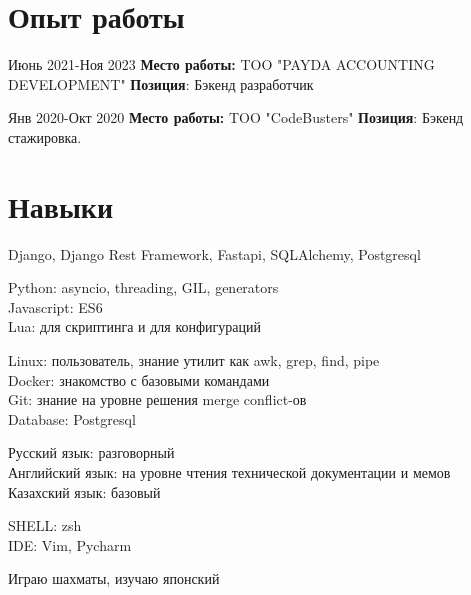 \documentclass[10pt]{article} %
\begin{document}
\section{Опыт работы}

\job
{Июнь 2021-}{Ноя 2023}
{\textbf{Место работы: }TOO "PAYDA ACCOUNTING DEVELOPMENT"}
{\textbf{Позиция}: Бэкенд разработчик}

\job
{Янв 2020-}{Окт 2020}
{\textbf{Место работы: }TOO "CodeBusters" }
{\textbf{Позиция}: Бэкенд стажировка. }




\section{Навыки}

{
  Django, Django Rest Framework, Fastapi, SQLAlchemy, Postgresql
}

{
  Python: asyncio, threading, GIL, generators\\
  Javascript: ES6\\
  Lua: для скриптинга и для конфигураций
}

{
  Linux: пользователь, знание утилит как awk, grep, find, pipe\\
  Docker: знакомство с базовыми командами\\
  Git: знание на уровне решения merge conflict-ов\\
  Database: Postgresql
}

{
  Русский язык: разговорный\\
  Английский язык: на уровне чтения технической документации и мемов\\
  Казахский язык: базовый
}


{
  SHELL: zsh\\
  IDE: Vim, Pycharm
}

{
  Играю шахматы, изучаю японский
}
\end{document}
